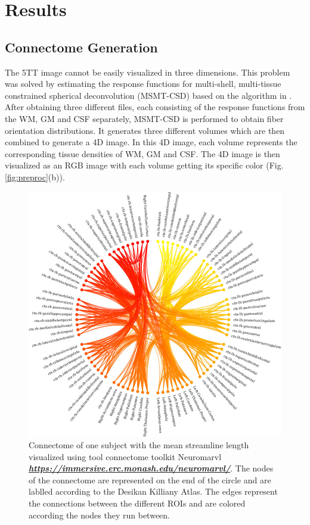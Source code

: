 \documentclass[msthesis.tex]{subfiles}
\begin{document}
\chapter{Results}
\section{Connectome Generation}

The 5TT image cannot be easily visualized in three dimensions. This problem was solved by estimating the response functions for multi-shell, multi-tissue constrained spherical deconvolution (MSMT-CSD)  based on the algorithm in \cite{jeurissen2014multi}. After obtaining three different files, each consisting of the response functions from the WM, GM and CSF separately, MSMT-CSD is performed to obtain fiber orientation distributions. It generates three different volumes which are then combined to generate a 4D image. In this 4D image, each volume represents the corresponding tissue densities of WM, GM and CSF. The 4D image is then visualized as an RGB image with each volume getting its specific color (Fig. \ref{fig:preproc}(b)).
\label{subsec:connectome_generation}
\begin{figure}
    \centering
    \includegraphics[width=\textwidth]{images/brain-data-viewer_2.png}
    \caption{Connectome of one subject with the mean streamline length visualized using tool connectome toolkit Neuromarvl \href{}{\textit{\textbf{https://immersive.erc.monash.edu/neuromarvl/}}}. The nodes of the connectome are represented on the end of the circle and are lablled according to the Desikan Killiany Atlas. The edges represent the connections between the different ROIs and are colored according the nodes they run between.}
    \label{fig:my_label}
\end{figure}
\end{document}
